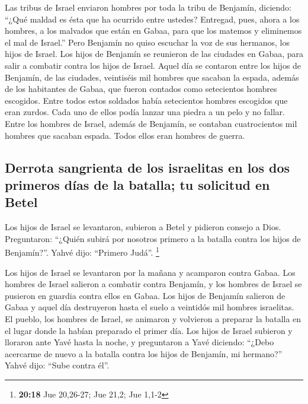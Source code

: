  Las tribus de Israel enviaron hombres por toda la tribu
de Benjamín, diciendo: ``¿Qué maldad es ésta que ha ocurrido entre
ustedes?  Entregad, pues, ahora a los hombres, a los
malvados que están en Gabaa, para que los matemos y eliminemos el mal de
Israel.'' Pero Benjamín no quiso escuchar la voz de sus hermanos, los
hijos de Israel.  Los hijos de Benjamín se reunieron de
las ciudades en Gabaa, para salir a combatir contra los hijos de Israel.
 Aquel día se contaron entre los hijos de Benjamín, de
las ciudades, veintiséis mil hombres que sacaban la espada, además de
los habitantes de Gabaa, que fueron contados como setecientos hombres
escogidos.  Entre todos estos soldados había setecientos
hombres escogidos que eran zurdos. Cada uno de ellos podía lanzar una
piedra a un pelo y no fallar.  Entre los hombres de
Israel, además de Benjamín, se contaban cuatrocientos mil hombres que
sacaban espada. Todos ellos eran hombres de guerra.

\hypertarget{derrota-sangrienta-de-los-israelitas-en-los-dos-primeros-duxedas-de-la-batalla-tu-solicitud-en-betel}{%
\subsection{Derrota sangrienta de los israelitas en los dos primeros
días de la batalla; tu solicitud en
Betel}\label{derrota-sangrienta-de-los-israelitas-en-los-dos-primeros-duxedas-de-la-batalla-tu-solicitud-en-betel}}

 Los hijos de Israel se levantaron, subieron a Betel y
pidieron consejo a Dios. Preguntaron: ``¿Quién subirá por nosotros
primero a la batalla contra los hijos de Benjamín?''. Yahvé dijo:
``Primero Judá''. \footnote{\textbf{20:18} Jue 20,26-27; Jue 21,2; Jue
  1,1-2}

 Los hijos de Israel se levantaron por la mañana y
acamparon contra Gabaa.  Los hombres de Israel salieron a
combatir contra Benjamín, y los hombres de Israel se pusieron en guardia
contra ellos en Gabaa.  Los hijos de Benjamín salieron de
Gabaa y aquel día destruyeron hasta el suelo a veintidós mil hombres
israelitas.  El pueblo, los hombres de Israel, se
animaron y volvieron a preparar la batalla en el lugar donde la habían
preparado el primer día.  Los hijos de Israel subieron y
lloraron ante Yavé hasta la noche, y preguntaron a Yavé diciendo:
``¿Debo acercarme de nuevo a la batalla contra los hijos de Benjamín, mi
hermano?'' Yahvé dijo: ``Sube contra él''.

